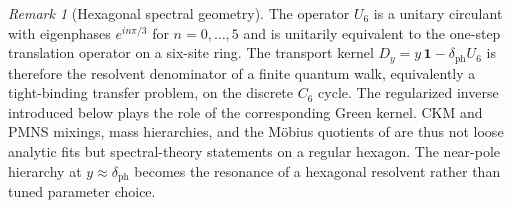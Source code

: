 \documentclass[11pt,a4paper]{article}
\theoremstyle{definition}
\theoremstyle{remark}
\newtheorem*{remark}{Remark}
\begin{document}
\begin{remark}[Hexagonal spectral geometry]
The operator $U_6$ is a unitary circulant with eigenphases $e^{in\pi/3}$ for $n=0,\dots,5$ and is unitarily equivalent to the one-step translation operator on a six-site ring. The transport kernel $D_y=y\,\mathbf 1-\delta_{\mathrm{ph}}U_6$ is therefore the resolvent denominator of a finite quantum walk, equivalently a tight-binding transfer problem, on the discrete $C_6$ cycle. The regularized inverse introduced below plays the role of the corresponding Green kernel. CKM and PMNS mixings, mass hierarchies, and the Möbius quotients of  are thus not loose analytic fits but spectral-theory statements on a regular hexagon. The near-pole hierarchy at $y\approx\delta_{\mathrm{ph}}$ becomes the resonance of a hexagonal resolvent rather than tuned parameter choice.
\end{remark}
\end{document}
